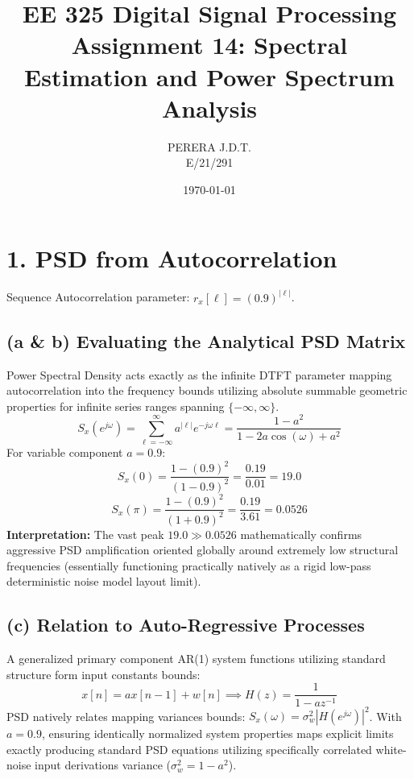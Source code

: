 \documentclass[11pt, a4paper]{article}
\title{EE 325 Digital Signal Processing \\ Assignment 14: Spectral Estimation and Power Spectrum Analysis}
\author{PERERA J.D.T. \\ E/21/291}
\date{\today}
\begin{document}
\maketitle

\section{1. PSD from Autocorrelation}
Sequence Autocorrelation parameter: $r_x[\ell] = (0.9)^{|\ell|}$.

\subsection{(a \& b) Evaluating the Analytical PSD Matrix}
Power Spectral Density acts exactly as the infinite DTFT parameter mapping autocorrelation into the frequency bounds utilizing absolute summable geometric properties for infinite series ranges spanning $\{-\infty, \infty\}$.
$$ S_x(e^{j\omega}) = \sum_{\ell=-\infty}^{\infty} a^{|\ell|} e^{-j\omega\ell} = \frac{1-a^2}{1 - 2a\cos(\omega) + a^2} $$
For variable component $a = 0.9$:
$$ S_x(0) = \frac{1 - (0.9)^2}{(1 - 0.9)^2} = \frac{0.19}{0.01} = \mathbf{19.0} $$
$$ S_x(\pi) = \frac{1 - (0.9)^2}{(1 + 0.9)^2} = \frac{0.19}{3.61} = \mathbf{0.0526} $$
\textbf{Interpretation:} The vast peak $19.0 \gg 0.0526$ mathematically confirms aggressive PSD amplification oriented globally around extremely low structural frequencies (essentially functioning practically natively as a rigid low-pass deterministic noise model layout limit).

\subsection{(c) Relation to Auto-Regressive Processes}
A generalized primary component AR(1) system functions utilizing standard structure form input constants bounds:
$$ x[n] = a x[n-1] + w[n] \implies H(z) = \frac{1}{1 - a z^{-1}} $$
PSD natively relates mapping variances bounds: $S_x(\omega) = \sigma_w^2 |H(e^{j\omega})|^2 $.
With $a=0.9$, ensuring identically normalized system properties maps explicit limits exactly producing standard PSD equations utilizing specifically correlated white-noise input derivations variance ($\sigma_w^2 = 1 - a^2$).
\end{document}
